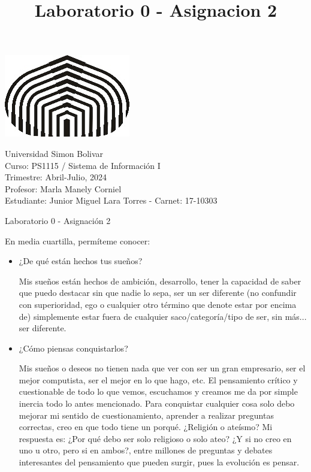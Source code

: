 \documentclass[a4paper,12pt]{article}
\title{Laboratorio 0 - Asignacion 2}
\begin{document}
\begin{center}
\par \includegraphics[scale=1]{USB} \par
Universidad Simon Bolivar \\ Curso: PS1115 / Sistema de Información I \\ Trimestre: Abril-Julio, 2024 \\ Profesor: Marla Manely Corniel \\ Estudiante: Junior Miguel Lara Torres - Carnet: 17-10303 \\
\end{center}

\begin{center}
Laboratorio 0 - Asignación 2
\end{center}

En media cuartilla, permíteme conocer:

\begin{itemize}
\item ¿De qué están hechos tus sueños?

Mis sueños están hechos de ambición, desarrollo, tener la capacidad de saber que puedo destacar sin que nadie lo sepa, ser un ser diferente (no confundir con superioridad, ego o cualquier otro término que denote estar por encima de) simplemente estar fuera de cualquier saco/categoría/tipo de ser, sin más... ser diferente.

\item ¿Cómo piensas conquistarlos?

Mis sueños o deseos no tienen nada que ver con ser un gran empresario, ser el mejor computista, ser el mejor en lo que hago, etc. El pensamiento crítico y cuestionable de todo lo que vemos, escuchamos y creamos me da por simple inercia todo lo antes mencionado. Para conquistar cualquier cosa solo debo mejorar mi sentido de cuestionamiento, aprender a realizar preguntas correctas, creo en que todo tiene un porqué. ¿Religión o ateísmo? Mi respuesta es: ¿Por qué debo ser solo religioso o solo ateo? ¿Y si no creo en uno u otro, pero si en ambos?, entre millones de preguntas y debates interesantes del pensamiento que pueden surgir, pues la evolución es pensar.

\end{itemize}
\end{document}
